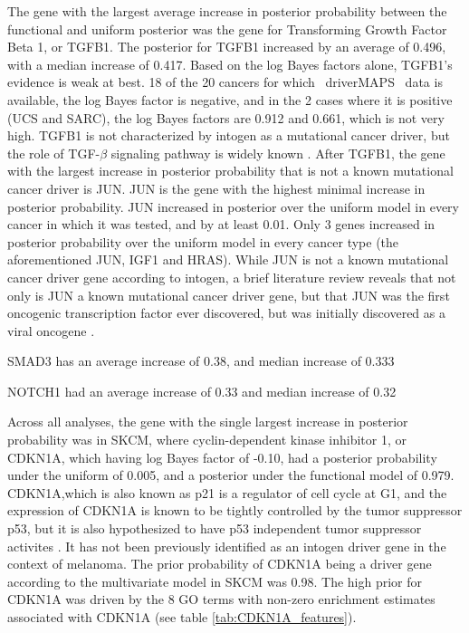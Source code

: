 The gene with the largest average increase in posterior probability between the functional and uniform posterior  was the gene for  Transforming Growth Factor Beta 1, or TGFB1.  The posterior for TGFB1 increased by an average of 0.496, with a median increase of 0.417.  Based on the log Bayes factors alone, TGFB1's evidence is weak at best.  18 of the 20 cancers for which ~driverMAPS~ data is available, the log Bayes factor is negative, and in the 2 cases where it is positive (UCS and SARC), the log Bayes factors are 0.912 and 0.661, which is not very high.  TGFB1 is not characterized by intogen as a mutational cancer driver, but the role of TGF-$\beta$ signaling pathway is widely known \cite{TGF_Zhao_2018}. After TGFB1, the gene with the largest increase in posterior probability that is not a known mutational cancer driver is JUN.  JUN is the gene with the highest minimal increase in posterior probability.  JUN increased in posterior over the uniform model in every cancer in which it was tested, and by at least 0.01.  Only 3 genes increased in posterior probability over the uniform model in every cancer type (the aforementioned JUN, IGF1 and HRAS). While JUN is not a known mutational cancer driver gene according to intogen, a brief literature review reveals that not only is JUN a known mutational cancer driver gene, but that JUN was the first oncogenic transcription factor ever discovered, but was initially discovered as a viral oncogene \cite{Vogt_2002}.  

SMAD3 has an average increase of 0.38, and median increase of 0.333

NOTCH1 had an average increase of 0.33 and median increase of 0.32







Across all analyses, the gene with the single largest increase in posterior probability was in SKCM, where cyclin-dependent kinase inhibitor 1, or CDKN1A, which having log Bayes factor of -0.10, had a posterior probability under the uniform of 0.005, and a posterior under the functional model of 0.979.  CDKN1A,which is also known as p21 is a regulator of cell cycle at G1, and the expression of CDKN1A is known to be tightly controlled by the tumor suppressor p53, but it is also hypothesized to have p53 independent tumor suppressor activites \cite{abbas09_p21_cancer}.  It has not been previously identified as an intogen driver gene in the context of melanoma. The prior probability of CDKN1A being a driver gene according to the multivariate model in SKCM was 0.98.  The high prior for CDKN1A was driven by the 8 GO terms with non-zero enrichment estimates associated with CDKN1A (see table \ref{tab:CDKN1A_features}).



